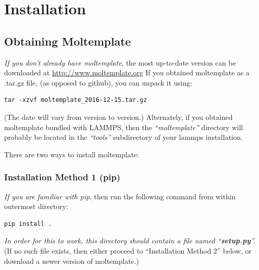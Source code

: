 \documentclass[11pt]{article}
\begin{document}




\section{Installation}

\subsection*{Obtaining Moltemplate}
\textit{If you don't already have moltemplate},
the most up-to-date version can be downloaded at
\url{http://www.moltemplate.org}
If you obtained moltemplate as a .tar.gz file,
(as opposed to github), you can unpack it using:
\begin{verbatim}
tar -xzvf moltemplate_2016-12-15.tar.gz
\end{verbatim}
(The date will vary from version to version.)
Alternately, if you obtained moltemplate bundled with LAMMPS, 
then the \textit{``moltemplate''} directory will probably be located 
in the \textit{``tools''} subdirectory of your lammps installation.

There are two ways to install moltemplate:

\subsubsection*{Installation Method 1 (pip)}

\textit{If you are familiar with pip}, then run the following command from within outermost directory:
\begin{verbatim}
pip install .
\end{verbatim}
\textit{In order for this to work, this directory should contain a file named ``\textbf{setup.py}''.}  (If no such file exists, then either proceed to ``Installation Method 2'' below, or download a newer version of moltemplate.)
\end{document}
